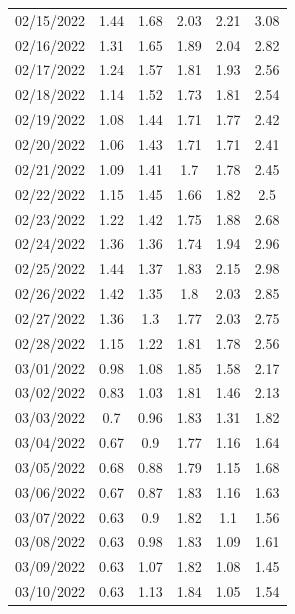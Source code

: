 \documentclass[withoutpreface,bwprint]{cumcmthesis} %
\begin{document}
\begin{appendices}
\begin{center}
\begin{longtable}{c|ccccc}
02/15/2022 & 1.44  & 1.68     & 2.03      & 2.21   & 3.08          \\
02/16/2022 & 1.31  & 1.65     & 1.89      & 2.04   & 2.82          \\
02/17/2022 & 1.24  & 1.57     & 1.81      & 1.93   & 2.56          \\
02/18/2022 & 1.14  & 1.52     & 1.73      & 1.81   & 2.54          \\
02/19/2022 & 1.08  & 1.44     & 1.71      & 1.77   & 2.42          \\
02/20/2022 & 1.06  & 1.43     & 1.71      & 1.71   & 2.41          \\
02/21/2022 & 1.09  & 1.41     & 1.7       & 1.78   & 2.45          \\
02/22/2022 & 1.15  & 1.45     & 1.66      & 1.82   & 2.5           \\
02/23/2022 & 1.22  & 1.42     & 1.75      & 1.88   & 2.68          \\
02/24/2022 & 1.36  & 1.36     & 1.74      & 1.94   & 2.96          \\
02/25/2022 & 1.44  & 1.37     & 1.83      & 2.15   & 2.98          \\
02/26/2022 & 1.42  & 1.35     & 1.8       & 2.03   & 2.85          \\
02/27/2022 & 1.36  & 1.3      & 1.77      & 2.03   & 2.75          \\
02/28/2022 & 1.15  & 1.22     & 1.81      & 1.78   & 2.56          \\
03/01/2022 & 0.98  & 1.08     & 1.85      & 1.58   & 2.17          \\
03/02/2022 & 0.83  & 1.03     & 1.81      & 1.46   & 2.13          \\
03/03/2022 & 0.7   & 0.96     & 1.83      & 1.31   & 1.82          \\
03/04/2022 & 0.67  & 0.9      & 1.77      & 1.16   & 1.64          \\
03/05/2022 & 0.68  & 0.88     & 1.79      & 1.15   & 1.68          \\
03/06/2022 & 0.67  & 0.87     & 1.83      & 1.16   & 1.63          \\
03/07/2022 & 0.63  & 0.9      & 1.82      & 1.1    & 1.56          \\
03/08/2022 & 0.63  & 0.98     & 1.83      & 1.09   & 1.61          \\
03/09/2022 & 0.63  & 1.07     & 1.82      & 1.08   & 1.45          \\
03/10/2022 & 0.63  & 1.13     & 1.84      & 1.05   & 1.54          \\

\end{longtable}
\end{center}
\end{appendices}
\end{document}
